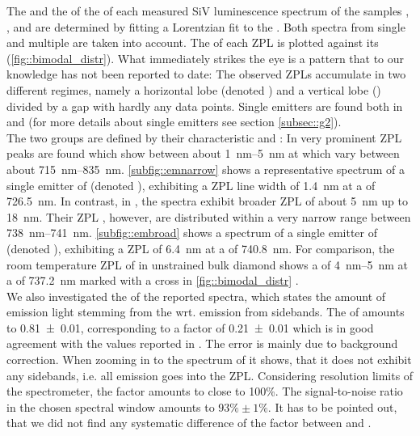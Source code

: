 	The \cwl and the \lw of the \zpl of each measured SiV luminescence spectrum of the samples \insituF, \insituS, and \insituH are determined by fitting a Lorentzian fit to the \ZPL.
	Both spectra from single and multiple \sivs are taken into account.
	The \lw of each ZPL is plotted against its \cwl (\autoref{fig::bimodal_distr}).
	What immediately strikes the eye is a pattern that to our knowledge has not been reported to date: 
	The observed ZPLs accumulate in two different regimes, namely a horizontal lobe (denoted \gh) and a vertical lobe (\gv) divided by a gap with hardly any data points. 
	Single emitters are found both in \gh and \gv (for more details about single emitters see section \ref{subsec::g2}).
	\\
	The two groups are defined by their characteristic \cwls and \lws: 
	In \gh very prominent ZPL peaks are found which show \lws between about \SIrange{1}{5}{nm} at \cwls which vary between about \SIrange{715}{835}{nm}.
	\autoref{subfig::emnarrow} shows a representative spectrum of a single emitter of \gh (denoted \emnarrow), exhibiting a ZPL line width of \SI{1.4}{nm} at a \cwl of \SI{726.5}{nm}.
	In contrast, in \gv, the spectra exhibit broader ZPL \lws of about \SI{5}{nm} up to \SI{18}{nm}.
	Their ZPL \cwls, however, are distributed within a very narrow range between \SIrange{738}{741}{nm}.
	\autoref{subfig::embroad} shows a spectrum of a single emitter of \gv (denoted \embroad), exhibiting a ZPL \lw of \SI{6.4}{nm} at a \cwl of \SI{740.8}{nm}.
	For comparison, the room temperature ZPL of \sivs in unstrained bulk diamond shows a \lw of \SIrange{4}{5}{nm} at a \cwl of \SI{737.2}{nm} marked with a cross in \autoref{fig::bimodal_distr} \cite{Arend2016a,Dietrich2014}. 
	\\
	We also investigated the \db of the reported spectra, which states the amount of emission light stemming from the \ZPL wrt. emission from sidebands.
	The \db of \emnarrow  amounts to \num[separate-uncertainty]{0.81(1)}, corresponding to a \hr factor of \num[separate-uncertainty]{0.21(1)} which is in good agreement with the values reported in \cite{Neu2011b}.
	The error is mainly due to background correction. 
	When zooming in to the spectrum of \embroad it shows, that it does not exhibit any sidebands, i.e. all emission goes into the ZPL. 
	Considering resolution limits of the spectrometer, the \db factor amounts to close to 100\%.
	The signal-to-noise ratio in the chosen spectral window amounts to $93\%\pm1\%$.
	It has to be pointed out, that we did not find any systematic difference of the \db factor between \gh and \gv.
